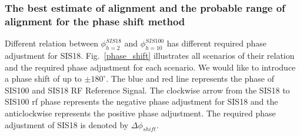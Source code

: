 \subsubsection{The best estimate of alignment and the probable range of alignment for the phase shift method}
Different relation between $\phi_{h=2}^{SIS18}$ and $\phi_{h=10}^{SIS100}$ has different required phase adjustment for SIS18. Fig.~\ref{phase_shift} illustrates all scenarios of their relation and the required phase adjustment for each scenario. We would like to introduce a phase shift of up to $\pm 180^\circ$. The blue and red line represents the phase of SIS100 and SIS18 RF Reference Signal. The clockwise arrow from the SIS18 to SIS100 rf phase represents   the negative phase adjustment for SIS18 and the anticlockwise represents the positive phase adjustment. The required phase adjustment of SIS18 is denoted by $\Delta \phi_{shift}$.
